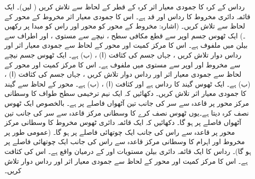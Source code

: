 رداس  کے کرہ کا جمودی معیار اثر کرہ کے قطر کے لحاظ سے تلاش کریں  ( لیں)۔
ایک قائمہ دائری مخروط کا رداس  اور قد  ہے۔ اس کا جمودی معیار اثر مخروط کے محور کے لحاظ سے تلاش کریں۔ (اشارہ: مخروط کے محور کو محور  اور راس کو مبدا پر رکھیں ۔)
ایک ٹھوس جسم اوپر سے قطع مکافی سطح ، نیچے سے مستوی ،  اور اطراف سے بیلن  میں ملفوف ہے۔ اس کا مرکز کمیت اور محور  کے لحاظ سے جمودی معیار اثر اور رداس دوار تلاش کریں ، جہاں جسم کی کثافت  (ا) ، (ب)  ہے۔
ایک ٹھوس جسم نیچے سے مخروط  اور اوپر سے مستوی   میں ملفوف ہے۔ اس کا مرکز کمیت اور محور  کے لحاظ سے جمودی معیار اثر اور رداس دوار تلاش کریں  ، جہاں جسم کی کثافت (ا) ، (ب)  ہے۔
ایک ٹھوس گیند کا رداس  ہے اور  کثافت (ا) ، (ب)  ہے۔ محور  کے لحاظ سے  گیند کا جمودی معیار اثر تلاش کریں۔
دکھائیں کہ ایک نیم  ترخیمی سطح طواف   کا وسطانی مرکز محور  پر  قاعدہ سے  سر  کی جانب  تین آٹھواں فاصلے پر ہے۔ بالخصوص  ایک  ٹھوس نصف کرہ دیتا ہے۔یوں ٹھوس نصف کرے کا وسطانی مرکز قاعدہ سے سر کی  جانب تین آٹھواں فاصلے پر ہو گا۔
دکھائیں کہ ایک قائمہ دائری  ٹھوس مخروط کا وسطانی مرکز محور پر قاعدہ سے راس کی  جانب ایک  چوتھائی فاصلے  پر ہو گا۔ (عمومی طور پر مخروط اور  اہرام کا وسطانی مرکز قاعدہ سے راس  کی جانب ایک چوتھائی فاصلے  پر ہو گا)۔
رداس  کا ایک قائمہ دائری بیلن  مستویات  اور  کے درمیان واقع  ہے۔ اس کی کثافت  ہے۔ اس کا مرکز کمیت اور محور  کے لحاظ سے جمودی معیار اثر اور رداس دوار تلاش کریں۔
